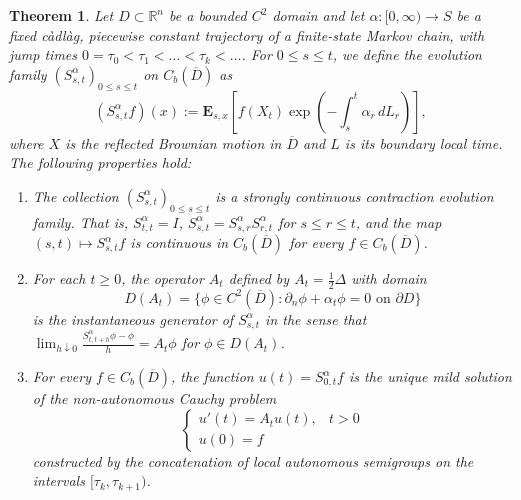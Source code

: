 \documentclass[11pt]{amsart}
\theoremstyle{plain}
\newtheorem{theorem}{Theorem}[section]
\theoremstyle{definition}
\theoremstyle{remark}
\begin{document}
\begin{theorem}
	\label{thm:quenched}
	Let $D \subset \mathbb{R}^n$ be a bounded $C^2$ domain and let $\alpha: [0, \infty) \to S$ be a fixed c\`adl\`ag, piecewise constant trajectory of a finite-state Markov chain, with jump times $0 = \tau_0 < \tau_1 < \dots < \tau_k < \dots$. For $0 \le s \le t$, we define the evolution family $(S_{s,t}^\alpha)_{0 \le s \le t}$ on $C_b(\overline{D})$ as$$(S_{s,t}^\alpha f)(x) := \mathbf{E}_{s,x} \left[ f(X_t) \exp\left( -\int_s^t \alpha_r \, dL_r \right) \right],$$where $X$ is the reflected Brownian motion in $\overline{D}$ and $L$ is its boundary local time. The following properties hold:
	\begin{enumerate}
	\item The collection $(S_{s,t}^\alpha)_{0 \le s \le t}$ is a strongly continuous contraction evolution family. That is, $S_{t,t}^\alpha = I$, $S_{s,t}^\alpha = S_{s,r}^\alpha S_{r,t}^\alpha$ for $s \le r \le t$, and the map $(s,t) \mapsto S_{s,t}^\alpha f$ is continuous in $C_b(\overline{D} )$ for every $f \in C_b(\overline{D})$.
	\item  For each $t \ge 0$, the operator $A_t$ defined by $A_t = \frac{1}{2}\Delta$ with domain$$D(A_t) = \{ \phi \in C^2(\overline{D}) : \partial_n \phi + \alpha_t \phi = 0 \text{ on } \partial D \}$$is the instantaneous generator of $S_{s,t}^\alpha$ in the sense that $\lim_{h \downarrow 0} \frac{S_{t,t+h}^\alpha \phi - \phi}{h} = A_t \phi$ for $\phi \in D(A_t)$.
	\item For every $f \in C_b(\overline{D})$,  the function $u(t) = S_{0,t}^\alpha f$ is the unique mild solution of the non-autonomous Cauchy problem$$\begin{cases} u'(t) = A_t u(t), & t > 0 \\ u(0) = f \end{cases}$$constructed by the concatenation of local autonomous semigroups on the intervals $[\tau_k, \tau_{k+1})$.
\end{enumerate}
\end{theorem}
\end{document}
